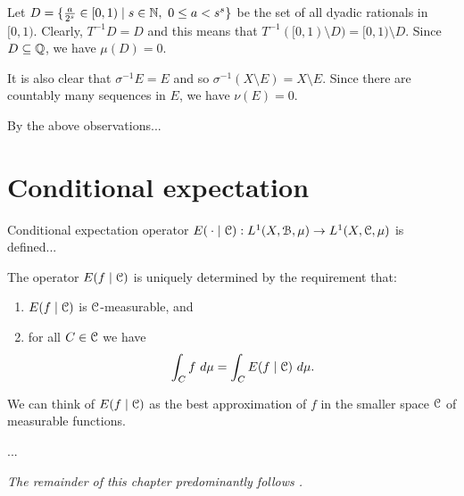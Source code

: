 Let $D = \{\frac{a}{2^s} \in [0, 1) \mid s \in \mathbb{N},\ 0 \leq a < s^s\}$ be the set of all dyadic rationals in $[0, 1)$. Clearly, $T^{-1}D = D$ and this means that $T^{-1}([0, 1) \setminus D) = [0, 1) \setminus D$. Since $D \subseteq \mathbb{Q}$, we have $\mu(D) = 0$.

It is also clear that $\sigma^{-1}E = E$ and so $\sigma^{-1}(X \setminus E) = X \setminus E$. Since there are countably many sequences in $E$, we have $\nu(E) = 0$.

By the above observations...

\section{Conditional expectation}
\begin{definition}
	Conditional expectation operator $E(\:\cdot \mid \mathcal{C}) : L^1(X, \mathcal{B}, \mu) \to L^1(X, \mathcal{C}, \mu)$ is defined...
\end{definition}

The operator $E(f \mid \mathcal{C})$ is uniquely determined by the requirement that:
\begin{enumerate}
	\item $E(f \mid \mathcal{C})$ is $\mathcal{C}$-measurable, and
	\item for all $C \in \mathcal{C}$ we have
	\[
	\int_C{f\ d\mu} = \int_C{E(f \mid \C)\ d\mu}.
	\]
\end{enumerate}

We can think of $E(f \mid \mathcal{C})$ as the best approximation of $f$ in the smaller space $\mathcal{C}$ of measurable functions.~\cite[Lecture 21]{ergodic-lectures}

...

\emph{The remainder of this chapter predominantly follows \cite[Chapter 4]{walters:intro-to-ergodic-theory}.}

